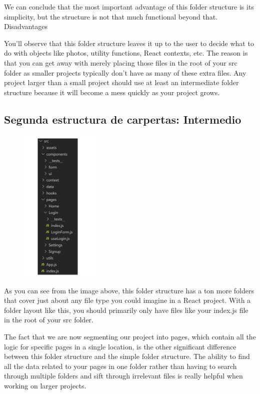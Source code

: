 We can conclude that the most important advantage of this folder structure is its simplicity, but the structure is not that much functional beyond that.
Disadvantages

You'll observe that this folder structure leaves it up to the user to decide what to do with objects like photos, utility functions, React contexts, etc. The reason is that you can get away with merely placing those files in the root of your src folder as smaller projects typically don't have as many of these extra files. Any project larger than a small project should use at least an intermediate folder structure because it will become a mess quickly as your project grows.

\subsection{Segunda estructura de carpertas: Intermedio}

\begin{figure}[h!]
  \center
  \begin{minipage}{5cm}
    \includegraphics[width=4cm]{Develop/Languages/JavaScript/Frameworks/React/images/FolderIntermedioReact.png}
  \end{minipage}
\end{figure}

As you can see from the image above, this folder structure has a ton more folders that cover just about any file type you could imagine in a React project. With a folder layout like this, you should primarily only have files like your index.js file in the root of your src folder.

The fact that we are now segmenting our project into pages, which contain all the logic for specific pages in a single location, is the other significant difference between this folder structure and the simple folder structure. The ability to find all the data related to your pages in one folder rather than having to search through multiple folders and sift through irrelevant files is really helpful when working on larger projects.

